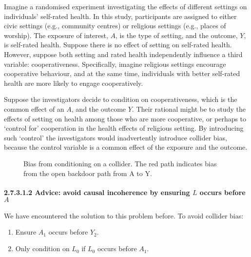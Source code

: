 \documentclass[
  singlecolumn]{article}
\let\oldparagraph\paragraph
\renewcommand{\paragraph}[1]{\oldparagraph{#1}\mbox{}}
\providecommand{\tightlist}{%
  \setlength{\itemsep}{0pt}\setlength{\parskip}{0pt}}\usepackage{longtable,booktabs,array}
\begin{document}
Imagine a randomised experiment investigating the effects of different
settings on individuals' self-rated health. In this study, participants
are assigned to either civic settings (e.g., community centres) or
religious settings (e.g., places of worship). The exposure of interest,
\(A\), is the type of setting, and the outcome, \(Y\), is self-rated
health. Suppose there is no effect of setting on self-rated health.
However, suppose both setting and rated health independently influence a
third variable: cooperativeness. Specifically, imagine religious
settings encourage cooperative behaviour, and at the same time,
individuals with better self-rated health are more likely to engage
cooperatively.

Suppose the investigators decide to condition on cooperativeness, which
is the common effect of an \(A\), and the outcome \(Y\). Their rational
might be to study the effects of setting on health among those who are
more cooperative, or perhaps to `control for' cooperation in the health
effects of religious setting. By introducing such `control' the
investigators would inadvertently introduce collider bias, because the
control variable is a common effect of the exposure and the outcome.

\begin{figure}


\caption{\label{fig-dag-common-effect}Bias from conditioning on a
collider. The red path indicates bias from the open backdoor path from A
to Y.}

\end{figure}%

\paragraph{\texorpdfstring{2.7.3.1.2 Advice: avoid causal incoherence by
ensuring \(L\) occurs before
\(A\)}{2.7.3.1.2 Advice: avoid causal incoherence by ensuring L occurs before A}}\label{advice-avoid-causal-incoherence-by-ensuring-l-occurs-before-a-2}

We have encountered the solution to this problem before. To avoid
collider bias:

\begin{enumerate}
\def\labelenumi{\arabic{enumi}.}
\tightlist
\item
  Ensure \(A_1\) occurs before \(Y_2\).
\item
  Only condition on \(L_0\) if \(L_0\) occurs before \(A_1\).
\end{enumerate}
\end{document}
